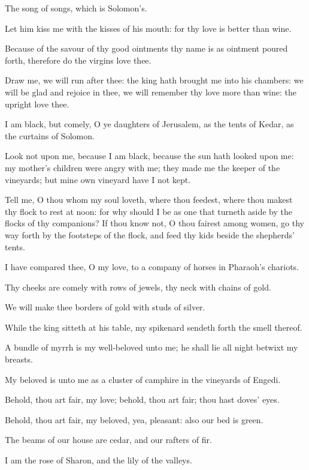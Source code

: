 \Chapter
\Verse The song of songs, which is Solomon's.

\Verse Let him kiss me with the kisses of his mouth: for thy love is better than wine.

\Verse Because of the savour of thy good ointments thy name is as ointment poured forth, therefore do the virgins love thee.

\Verse Draw me, we will run after thee: the king hath brought me into his chambers: we will be glad and rejoice in thee, we will remember thy love more than wine: the upright love thee.

\Verse I am black, but comely, O ye daughters of Jerusalem, as the tents of Kedar, as the curtains of Solomon.

\Verse Look not upon me, because I am black, because the sun hath looked upon me: my mother's children were angry with me; they made me the keeper of the vineyards; but mine own vineyard have I not kept.

\Verse Tell me, O thou whom my soul loveth, where thou feedest, where thou makest thy flock to rest at noon: for why should I be as one that turneth aside by the flocks of thy companions?  \Verse If thou know not, O thou fairest among women, go thy way forth by the footsteps of the flock, and feed thy kids beside the shepherds' tents.

\Verse I have compared thee, O my love, to a company of horses in Pharaoh's chariots.

\Verse Thy cheeks are comely with rows of jewels, thy neck with chains of gold.

\Verse We will make thee borders of gold with studs of silver.

\Verse While the king sitteth at his table, my spikenard sendeth forth the smell thereof.

\Verse A bundle of myrrh is my well-beloved unto me; he shall lie all night betwixt my breasts.

\Verse My beloved is unto me as a cluster of camphire in the vineyards of Engedi.

\Verse Behold, thou art fair, my love; behold, thou art fair; thou hast doves' eyes.

\Verse Behold, thou art fair, my beloved, yea, pleasant: also our bed is green.

\Verse The beams of our house are cedar, and our rafters of fir.


\Chapter
\Verse I am the rose of Sharon, and the lily of the valleys.

